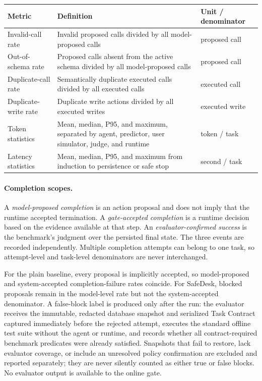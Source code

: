 \begin{center}
\begin{minipage}{\linewidth}
\centering
{}
\label{tab:tool-resource-metric-definitions}
\small
\begin{tabularx}{\linewidth}{@{}lYY@{}}
\toprule
Metric & Definition & Unit / denominator \\
\midrule
Invalid-call rate & Invalid proposed calls divided by all model-proposed calls & proposed call \\
Out-of-schema rate & Proposed calls absent from the active schema divided by all model-proposed calls & proposed call \\
Duplicate-call rate & Semantically duplicate executed calls divided by all executed calls & executed call \\
Duplicate-write rate & Duplicate write actions divided by all executed writes & executed write \\
Token statistics & Mean, median, P95, and maximum, separated by agent, predictor, user simulator, judge, and runtime & token / task \\
Latency statistics & Mean, median, P95, and maximum from induction to persistence or safe stop & second / task \\
\bottomrule
\end{tabularx}
\end{minipage}
\end{center}

\paragraph{Completion scopes.}
A \emph{model-proposed completion} is an action proposal and does not imply that
the runtime accepted termination. A \emph{gate-accepted completion} is a runtime
decision based on the evidence available at that step. An
\emph{evaluator-confirmed success} is the benchmark's judgment over the persisted
final state. The three events are recorded independently. Multiple completion
attempts can belong to one task, so attempt-level and task-level denominators are
never interchanged.

For the plain baseline, every  proposal is implicitly accepted,
so model-proposed and system-accepted completion-failure rates coincide. For
SafeDesk, blocked proposals remain in the model-level rate but not the
system-accepted denominator. A false-block label is produced only after the run:
the evaluator receives the immutable, redacted database snapshot and serialized
Task Contract captured immediately before the rejected attempt, executes the
standard offline test suite without the agent or runtime, and records whether all
contract-required benchmark predicates were already satisfied. Snapshots that fail
to restore, lack evaluator coverage, or include an unresolved policy confirmation
are excluded and reported separately; they are never silently counted as either
true or false blocks. No evaluator output is available to the online gate.

